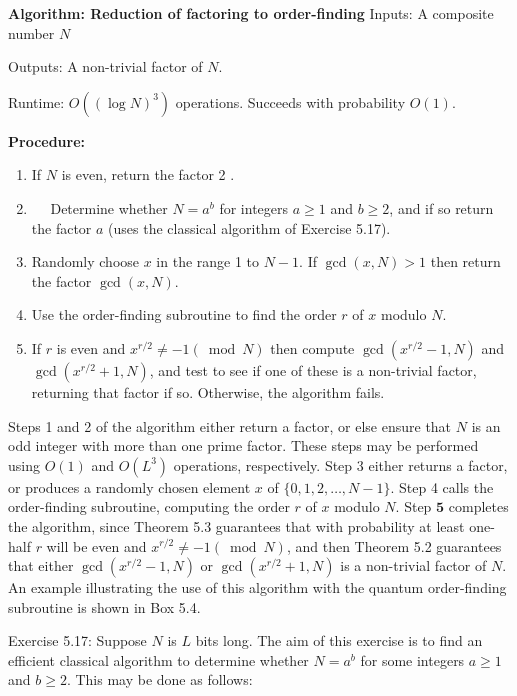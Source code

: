 \textbf{Algorithm: Reduction of factoring to order-finding}
Inputs: A composite number $N$

Outputs: A non-trivial factor of $N$.

Runtime: $O\left((\log N)^{3}\right)$ operations. Succeeds with probability $O(1)$.

\textbf{Procedure:}
\begin{enumerate}
  \item If $N$ is even, return the factor 2 .

  \item $\quad$ Determine whether $N=a^{b}$ for integers $a \geq 1$ and $b \geq 2$, and if so return the factor $a$ (uses the classical algorithm of Exercise 5.17).

  \item Randomly choose $x$ in the range 1 to $N-1$. If $\operatorname{gcd}(x, N)>1$ then return the factor $\operatorname{gcd}(x, N)$.

  \item Use the order-finding subroutine to find the order $r$ of $x$ modulo $N$.

  \item If $r$ is even and $x^{r / 2} \neq-1(\bmod N)$ then compute $\operatorname{gcd}\left(x^{r / 2}-1, N\right)$ and $\operatorname{gcd}\left(x^{r / 2}+1, N\right)$, and test to see if one of these is a non-trivial factor, returning that factor if so. Otherwise, the algorithm fails.

\end{enumerate}

Steps 1 and 2 of the algorithm either return a factor, or else ensure that $N$ is an odd integer with more than one prime factor. These steps may be performed using $O(1)$ and $O\left(L^{3}\right)$ operations, respectively. Step 3 either returns a factor, or produces a randomly chosen element $x$ of $\{0,1,2, \ldots, N-1\}$. Step 4 calls the order-finding subroutine, computing the order $r$ of $x$ modulo $N$. Step $\mathbf{5}$ completes the algorithm, since Theorem 5.3 guarantees that with probability at least one-half $r$ will be even and $x^{r / 2} \neq-1(\bmod N)$, and then Theorem 5.2 guarantees that either $\operatorname{gcd}\left(x^{r / 2}-1, N\right)$ or $\operatorname{gcd}\left(x^{r / 2}+1, N\right)$ is a non-trivial factor of $N$. An example illustrating the use of this algorithm with the quantum order-finding subroutine is shown in Box 5.4.

Exercise 5.17: Suppose $N$ is $L$ bits long. The aim of this exercise is to find an efficient classical algorithm to determine whether $N=a^{b}$ for some integers $a \geq 1$ and $b \geq 2$. This may be done as follows:

